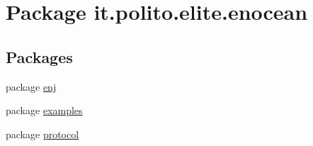 \hypertarget{namespaceit_1_1polito_1_1elite_1_1enocean}{}\section{Package it.\+polito.\+elite.\+enocean}
\label{namespaceit_1_1polito_1_1elite_1_1enocean}
\subsection*{Packages}
\begin{DoxyCompactItemize}
\item 
package \hyperlink{namespaceit_1_1polito_1_1elite_1_1enocean_1_1enj}{enj}
\item 
package \hyperlink{namespaceit_1_1polito_1_1elite_1_1enocean_1_1examples}{examples}
\item 
package \hyperlink{namespaceit_1_1polito_1_1elite_1_1enocean_1_1protocol}{protocol}
\end{DoxyCompactItemize}
